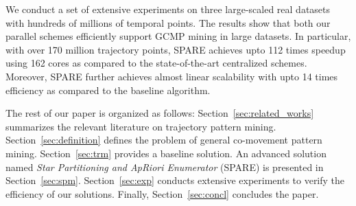 We conduct a set of extensive experiments on three large-scaled real datasets with hundreds of millions of
temporal points. 
The results show that both our parallel schemes efficiently support GCMP mining in large datasets.
In particular, with over 170 million trajectory points,
SPARE achieves upto 112 times speedup using 162 cores as compared to the state-of-the-art centralized schemes.
Moreover, SPARE further achieves almost linear scalability with upto 14 times efficiency
as compared to the baseline algorithm.

The rest of our paper is organized as follows: Section~\ref{sec:related_works} summarizes the relevant literature on 
trajectory pattern mining. Section~\ref{sec:definition} defines the problem of general co-movement pattern mining. Section~\ref{sec:trm} provides a baseline solution. An advanced solution named
\emph{Star Partitioning and ApRiori Enumerator} (SPARE) is presented in Section~\ref{sec:spm}. Section~\ref{sec:exp} conducts extensive experiments to verify the efficiency of our solutions. Finally, Section~\ref{sec:concl} concludes the paper.
